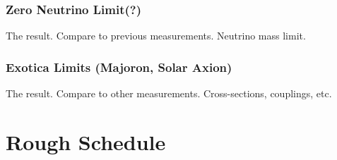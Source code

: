 \documentclass[12pt,letterpaper,onecolumn]{article}
\begin{document}
\subsubsection{Zero Neutrino Limit(?)}
The result. Compare to previous measurements. Neutrino mass limit.

\subsubsection{Exotica Limits (Majoron, Solar Axion)}
The result. Compare to other measurements. Cross-sections, couplings, etc.

\newpage

\section{Rough Schedule}
\end{document}
